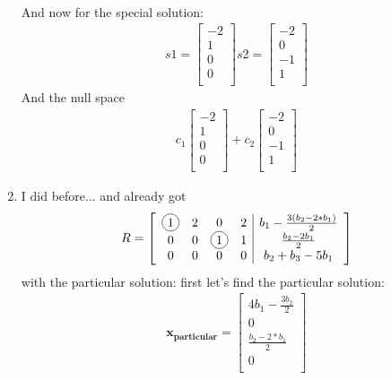 \documentclass[a4paper,11pt]{article}
\newcommand*\circled[1]{\tikz[baseline=(char.base)]{
             \node[shape=circle,draw,inner sep=2pt] (char) {#1};}}
\newcommand{\mybf}[1]{\boldsymbol{#1}}
\begin{document}
\begin{enumerate}
\begin{align}
\end{align}
And now for the special solution:
\begin{align}
s1 = 
\begin{bmatrix}
-2 \\
1 \\
0  \\
0 \\
\end{bmatrix}
s2 = 
\begin{bmatrix}
-2 \\
0 \\
-1  \\
1 \\
\end{bmatrix}
\end{align}
And the null space
\begin{align}
c_1 
\begin{bmatrix}
-2 \\
1 \\
0  \\
0 \\
\end{bmatrix}
+
c_2 
\begin{bmatrix}
-2 \\
0 \\
-1  \\
1 \\
\end{bmatrix}
\end{align}
\item I did before... and already got
\begin{align}
R = 
\left[
\begin{array}{cccc|c}
\circled{1} & 2 &           0 & 2 & b_1-\frac{3(b_2-2*b_1)}{2} \\
0           & 0 & \circled{1} & 1 & \frac{b_2-2b_1}{2}  \\
0           & 0 &           0 & 0 & b_2+b_3-5b_1 \\
\end{array}
\right]
\end{align}
with the particular solution:
first let's find the particular solution:
\begin{align}
\mybf{x_{particular}} = 
\begin{bmatrix}
4b_1-\frac{3b_2}{2} \\
0 \\
\frac{b_2-2*b_1}{2}  \\
0 \\
\end{bmatrix}

\end{align}
\end{enumerate}
\end{document}
